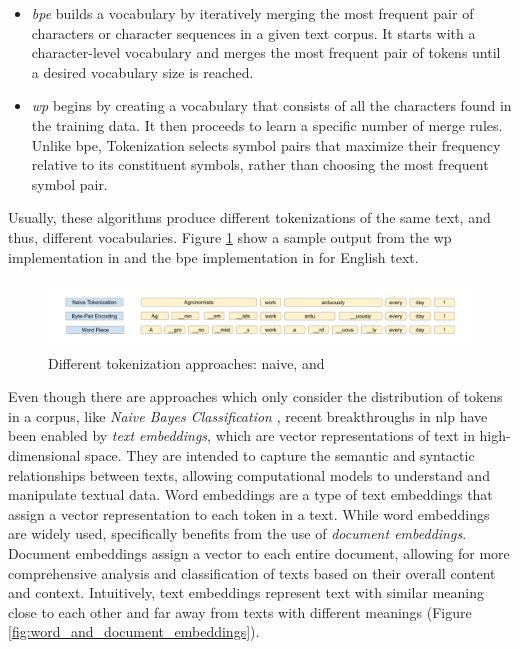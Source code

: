 \begin{itemize}
    \item \emph{\gls{bpe}}  builds a vocabulary by iteratively merging the most frequent pair of characters or character sequences in a given text corpus. It starts with a character-level vocabulary and merges the most frequent pair of tokens until a desired vocabulary size is reached.
    \item \emph{\gls{wp}}  begins by creating a vocabulary that consists of all the characters found in the training data. It then proceeds to learn a specific number of merge rules. Unlike \gls{bpe}, \wordpiece{} Tokenization selects symbol pairs that maximize their frequency relative to its constituent symbols, rather than choosing the most frequent symbol pair.
\end{itemize}

Usually, these algorithms produce different tokenizations of the same text, and thus, different vocabularies. Figure \ref{fig:02_tokenizer_comparison} show a sample output from the \gls{wp} implementation in  and the \gls{bpe} implementation in  for English text.

\begin{figure}
    \centering
    \includegraphics[width=\textwidth]{Figures/02/02_Tokenizer_comparison.png}
    \caption{Different tokenization approaches: naive, \wordpiece{} and \bpe}
    \label{fig:02_tokenizer_comparison}
\end{figure}

Even though there are \textclassification{} approaches which only consider the distribution of tokens in a corpus, like \emph{Naive Bayes Classification} , recent breakthroughs in \gls{nlp} have been enabled by \emph{text embeddings}, which are vector representations of text in high-dimensional space. They are intended to capture the semantic and syntactic relationships between texts, allowing computational models to understand and manipulate textual data. Word embeddings are a type of text embeddings that assign a vector representation to each token in a text. While word embeddings are widely used, \textclassification{} specifically benefits from the use of \emph{document embeddings}. Document embeddings assign a vector to each entire document, allowing for more comprehensive analysis and classification of texts based on their overall content and context. Intuitively, text embeddings represent text with similar meaning close to each other and far away from texts with different meanings (Figure \ref{fig:word_and_document_embeddings}).

